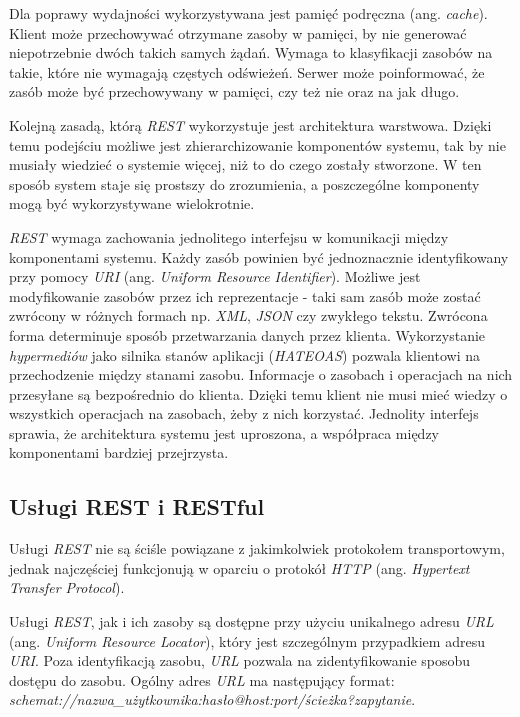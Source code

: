 Dla poprawy wydajności wykorzystywana  jest pamięć podręczna (ang. \textsl{cache}). Klient może przechowywać otrzymane zasoby w pamięci, by nie generować niepotrzebnie dwóch takich samych żądań. Wymaga to klasyfikacji zasobów na takie, które nie wymagają częstych odświeżeń. Serwer może poinformować, że zasób może być przechowywany w pamięci, czy też nie oraz na jak długo.  

Kolejną zasadą, którą \textsl{REST} wykorzystuje jest architektura warstwowa. Dzięki temu podejściu możliwe jest zhierarchizowanie komponentów systemu, tak by nie  musiały wiedzieć o systemie więcej, niż to do czego zostały stworzone. W ten sposób system staje się prostszy do zrozumienia, a poszczególne komponenty mogą być wykorzystywane wielokrotnie.


\textsl{REST} wymaga zachowania jednolitego interfejsu w komunikacji między komponentami systemu. Każdy zasób powinien być jednoznacznie identyfikowany przy pomocy \textsl{URI} (ang. \textsl{Uniform Resource Identifier}). Możliwe jest modyfikowanie zasobów przez ich reprezentacje - taki sam zasób może zostać zwrócony w różnych formach np. \textsl{XML}, \textsl{JSON} czy zwykłego tekstu. Zwrócona forma determinuje sposób przetwarzania danych przez klienta. Wykorzystanie  \textsl{hypermediów} jako silnika stanów aplikacji (\textsl{HATEOAS}) pozwala klientowi na przechodzenie między stanami zasobu. Informacje o  zasobach i operacjach na nich przesyłane są bezpośrednio do klienta. Dzięki temu klient nie musi mieć wiedzy o wszystkich operacjach na zasobach, żeby z nich korzystać. Jednolity interfejs sprawia, że architektura systemu jest uproszona, a współpraca między komponentami bardziej przejrzysta.
 
\subsection{Usługi REST i RESTful}
Usługi \textsl{REST} nie są ściśle powiązane z jakimkolwiek protokołem transportowym, jednak najczęściej funkcjonują w oparciu o protokół \textsl{HTTP} (ang. \textsl{Hypertext Transfer Protocol}).

Usługi \textsl{REST}, jak i ich zasoby są dostępne przy użyciu unikalnego adresu \textsl{URL} (ang. \textsl{Uniform Resource Locator}), który jest szczególnym przypadkiem adresu \textsl{URI}. Poza identyfikacją zasobu, \textsl{URL} pozwala na zidentyfikowanie sposobu dostępu do zasobu. Ogólny adres \textsl{URL} ma następujący format: \\ \textsl{schemat://nazwa\_użytkownika:hasło@host:port/ścieżka?zapytanie}. 


